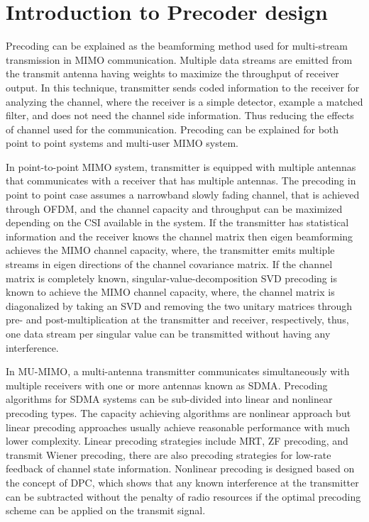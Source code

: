 
\section{Introduction to Precoder design}

Precoding can be explained as the beamforming method used for multi-stream transmission in \ac{MIMO} communication. Multiple data streams are emitted from the transmit antenna having weights to maximize the throughput of receiver output. In this technique, transmitter sends coded information to the receiver for analyzing the channel, where the receiver is a simple detector, example a matched filter, and does not need the channel side information. Thus reducing the effects of channel used for the communication. Precoding can be explained for both point to point systems and multi-user \ac{MIMO} system.

In point-to-point \ac{MIMO} system, transmitter is equipped with multiple antennas that communicates with a receiver that has multiple antennas. The precoding in point to point case assumes a narrowband slowly fading channel, that is achieved through \ac{OFDM}, and the channel capacity and throughput can be maximized depending on the \ac{CSI} available in the system. If the transmitter has statistical information and the receiver knows the channel matrix then eigen beamforming achieves the \ac{MIMO} channel capacity, where, the transmitter emits multiple streams in eigen directions of the channel covariance matrix. If the channel matrix is completely known, singular-value-decomposition \ac{SVD} precoding is known to achieve the \ac{MIMO} channel capacity, where, the channel matrix is diagonalized by taking an \ac{SVD} and removing the two unitary matrices through pre- and post-multiplication at the transmitter and receiver, respectively, thus, one data stream per singular value can be transmitted without having any interference.

In \ac{MU-MIMO}, a multi-antenna transmitter communicates simultaneously with multiple receivers with one or more antennas known as \ac{SDMA}. Precoding algorithms for \ac{SDMA} systems can be sub-divided into linear and nonlinear precoding types. The capacity achieving algorithms are nonlinear approach but linear precoding approaches usually achieve reasonable performance with much lower complexity. Linear precoding strategies include \ac{MRT},  \ac{ZF} precoding, and transmit Wiener precoding, there are also precoding strategies for low-rate feedback of channel state information. Nonlinear precoding is designed based on the concept of \ac{DPC}, which shows that any known interference at the transmitter can be subtracted without the penalty of radio resources if the optimal precoding scheme can be applied on the transmit signal.

